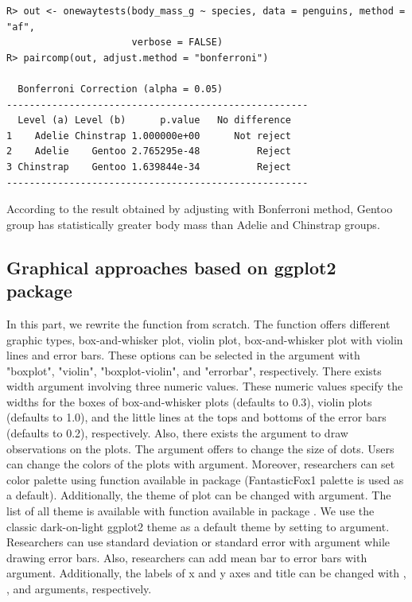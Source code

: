 \begin{verbatim}
R> out <- onewaytests(body_mass_g ~ species, data = penguins, method = "af", 
                      verbose = FALSE)
R> paircomp(out, adjust.method = "bonferroni")

  Bonferroni Correction (alpha = 0.05) 
----------------------------------------------------- 
  Level (a) Level (b)      p.value   No difference
1    Adelie Chinstrap 1.000000e+00      Not reject
2    Adelie    Gentoo 2.765295e-48          Reject
3 Chinstrap    Gentoo 1.639844e-34          Reject
----------------------------------------------------- 
\end{verbatim}

According to the result obtained by adjusting with Bonferroni method, Gentoo group has statistically greater body mass than Adelie and Chinstrap groups.

\subsection{Graphical approaches based on ggplot2 package}\label{graphs}

In this part, we rewrite the  function from scratch. The  function offers different graphic types, box-and-whisker plot, violin plot, box-and-whisker plot with violin lines and error bars. These options can be selected in the  argument with "boxplot", "violin", "boxplot-violin", and "errorbar", respectively. There exists width argument involving three numeric values. These numeric values specify the widths for the boxes of box-and-whisker plots (defaults to 0.3), violin plots (defaults to 1.0), and the little lines at the tops and bottoms of the error bars (defaults to 0.2), respectively. Also, there exists the  argument to draw observations on the plots. The  argument offers to change the size of dots. Users can change the colors of the plots with  argument. Moreover, researchers can set color palette using  function available in  package (FantasticFox1 palette is used as a default). Additionally, the theme of plot can be changed with  argument. The list of all theme is available with  function available in  package \citep{Wickham2016ggplot2}. We use the classic dark-on-light ggplot2 theme as a default theme by setting  to  argument. Researchers can use standard deviation or standard error with  argument while drawing error bars. Also, researchers can add mean bar to error bars with  argument. Additionally, the labels of x and y axes and title can be changed with , , and  arguments, respectively. 


